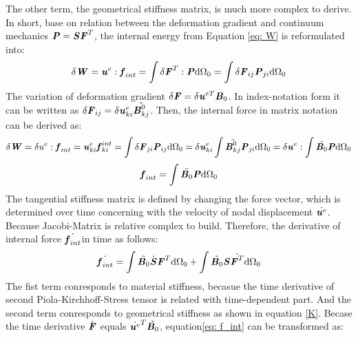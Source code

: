 The other term, the geometrical stiffness matrix, is much more complex to derive. In short, base on relation between the deformation gradient and continuum mechanics $\textbf{\textit{P}} = \textbf{\textit{S}}\textbf{\textit{F}}^T$, the internal energy from Equation \ref{eq: W} is reformulated into:  
\begin{equation}
\delta \textbf{\textit{W}} = \textbf{\textit{u}}^e : \textbf{\textit{f}}_{int} = \int \delta \textbf{\textit{F}}^T : \textbf{\textit{P}} \mathrm{d}\Omega_0 = \int \delta \textbf{\textit{F}}_{ij} \textbf{\textit{P}}_{ji} \mathrm{d}\Omega_0
\end{equation}
The variation of deformation gradient $\delta \textbf{\textit{F}} = \delta \textbf{\textit{u}}^{eT} \textbf{\textit{B}}_0$. In index-notation form it can be written as $\delta \textbf{\textit{F}}_{ij} = \delta \textbf{\textit{u}}_{ki}^e \tilde{\textbf{\textit{B}}_{kj}^0}$. Then, the internal force in matrix notation can be derived as:
\begin{equation}
\delta \textbf{\textit{W}} = \delta u^e : \textbf{\textit{f}}_{int} = \textbf{\textit{u}}_{ki}^e \textbf{\textit{f}}_{ki}^{int} = \int \delta \textbf{\textit{F}}_{ji} \textbf{\textit{P}}_{ij} \mathrm{d}\Omega_0 = \delta \textbf{\textit{u}}_{ki}^e \int \tilde{\textbf{\textit{B}}_{kj}^0} \textbf{\textit{P}}_{ji}\mathrm{d}\Omega_0 = \delta \textbf{\textit{u}}^e : \int \tilde{\textbf{\textit{B}}_0} \textbf{\textit{P}} \mathrm{d}\Omega_0
\end{equation}
\begin{equation}
\textbf{\textit{f}}_{int} = \int \tilde{\textbf{\textit{B}}_0} \textbf{\textit{P}} \mathrm{d}\Omega_0
\end{equation}
The tangential stiffness matrix is defined by changing the force vector, which is determined over time concerning with the velocity of nodal displacement $\dot{\textbf{\textit{u}}^e}$. Because Jacobi-Matrix is relative complex to build. Therefore, the derivative of internal force $\dot{\textbf{\textit{f}}_{int}}$in time as follows:
\begin{equation} \label{eq: f_int}
\dot{\textbf{\textit{f}}_{int}} = \int \tilde{\textbf{\textit{B}}_0} \dot{\textbf{\textit{S}}} \textbf{\textit{F}}^T \mathrm{d}\Omega_0 + \int \tilde{\textbf{\textit{B}}_0} \textbf{\textit{S}} \dot{\textbf{\textit{F}}^T} \mathrm{d}\Omega_0
\end{equation}
The fist term conresponds to material stiffness, becasue the time derivative of second Piola-Kirchhoff-Stress tensor is related with time-dependent part. And the second term conresponds to geometrical stiffness as shown in equation \ref{K}. Becase the time derivative $\dot {\textbf{\textit{F}}}$ equals $\dot{\textbf{\textit{u}}^e}^T \tilde{\textbf{\textit{B}}_0}$, equation\ref{eq: f_int} can be transformed as:
